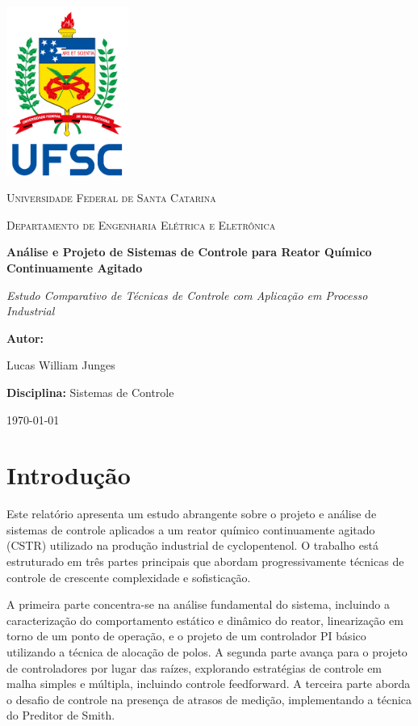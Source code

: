 \documentclass[a4paper,12pt]{report}
\newcommand{\reporttitle}{Análise e Projeto de Sistemas de Controle para Reator Químico Continuamente Agitado}
\newcommand{\reportsubtitle}{Estudo Comparativo de Técnicas de Controle com Aplicação em Processo Industrial}
\newcommand{\reportauthor}{Lucas William Junges}
\newcommand{\reportdate}{\today}
\newcommand{\reportinstitution}{Universidade Federal de Santa Catarina}
\newcommand{\reportdepartment}{Departamento de Engenharia Elétrica e Eletrônica}
\newcommand{\reportcourse}{Sistemas de Controle}
\begin{document}
\begin{titlepage}
    \centering
    \vspace*{1cm}
    \includegraphics[width=0.3\textwidth]{Imagens/BrasaoUFSC.png}
    \par\vspace{1cm}
    {\scshape\Large \reportinstitution\par}
    {\scshape\normalsize \reportdepartment\par}
    \vspace{1.5cm}
    {\huge\bfseries \reporttitle\par}
    \vspace{0.5cm}
    {\Large\itshape \reportsubtitle\par}
    \vspace{2cm}
    {\Large\textbf{Autor:}\par}
    {\Large \reportauthor\par}
    \vspace{1.5cm}
    {\large\textbf{Disciplina:} \reportcourse\par}
    \vspace{1cm}
    \vfill
    {\large \reportdate\par}
\end{titlepage}

\tableofcontents
\listoffigures
\clearpage

\chapter{Introdução}
Este relatório apresenta um estudo abrangente sobre o projeto e análise de sistemas de controle aplicados a um reator químico continuamente agitado (CSTR) utilizado na produção industrial de cyclopentenol. O trabalho está estruturado em três partes principais que abordam progressivamente técnicas de controle de crescente complexidade e sofisticação.

A primeira parte concentra-se na análise fundamental do sistema, incluindo a caracterização do comportamento estático e dinâmico do reator, linearização em torno de um ponto de operação, e o projeto de um controlador PI básico utilizando a técnica de alocação de polos. A segunda parte avança para o projeto de controladores por lugar das raízes, explorando estratégias de controle em malha simples e múltipla, incluindo controle feedforward. A terceira parte aborda o desafio de controle na presença de atrasos de medição, implementando a técnica do Preditor de Smith.
\end{document}
